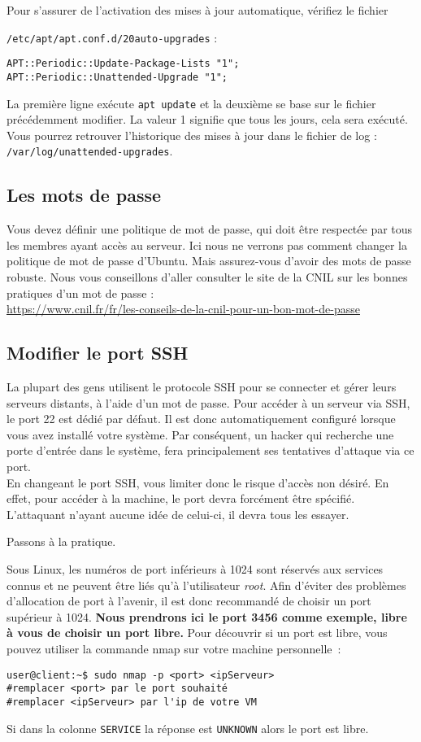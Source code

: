Pour s'assurer de l'activation des mises à jour automatique, vérifiez le fichier

\texttt{/etc/apt/apt.conf.d/20auto-upgrades} : 
\begin{verbatim}
APT::Periodic::Update-Package-Lists "1";
APT::Periodic::Unattended-Upgrade "1";
\end{verbatim}
La première ligne exécute \texttt{apt update} et la deuxième se base sur le fichier précédemment modifier. La valeur 1 signifie que tous les jours, cela sera exécuté. Vous pourrez retrouver l'historique des mises à jour dans le fichier de log : \texttt{/var/log/unattended-upgrades}.

\subsection{Les mots de passe} \label{POLITIQUE}
Vous devez définir une politique de mot de passe, qui doit être respectée par tous les membres ayant accès au serveur. Ici nous ne verrons pas comment changer la politique de mot de passe d'Ubuntu. Mais assurez-vous d'avoir des mots de passe robuste. Nous vous conseillons d'aller consulter le site de la CNIL sur les bonnes pratiques d'un mot de passe : \\\url{https://www.cnil.fr/fr/les-conseils-de-la-cnil-pour-un-bon-mot-de-passe}

\subsection{Modifier le port SSH}
La plupart des gens utilisent le protocole SSH pour se connecter et gérer leurs serveurs distants, à l’aide d’un mot de passe. Pour accéder à un serveur via SSH, le port 22 est dédié par défaut. Il est donc automatiquement configuré lorsque vous avez installé votre système. Par conséquent, un hacker qui recherche une porte d'entrée dans le système, fera principalement ses tentatives d’attaque via ce port. \\
En changeant le port SSH, vous limiter donc le risque d'accès non désiré. En effet, pour accéder à la machine, le port devra forcément être spécifié. L'attaquant n'ayant aucune idée de celui-ci, il devra tous les essayer. 

Passons à la pratique.

Sous Linux, les numéros de port inférieurs à 1024 sont réservés aux services connus et ne peuvent être liés qu'à l'utilisateur \emph{root}. Afin d'éviter des problèmes d'allocation de port à l'avenir, il est donc recommandé de choisir un port supérieur à 1024.
\textbf{Nous prendrons ici le port 3456 comme exemple, libre à vous de choisir un port libre.} Pour découvrir si un port est libre, vous pouvez utiliser la commande nmap sur votre machine personnelle : 
\begin{verbatim}
user@client:~$ sudo nmap -p <port> <ipServeur> 
#remplacer <port> par le port souhaité
#remplacer <ipServeur> par l'ip de votre VM
\end{verbatim}
Si dans la colonne \texttt{SERVICE} la réponse est \texttt{UNKNOWN} alors le port est libre. \\

